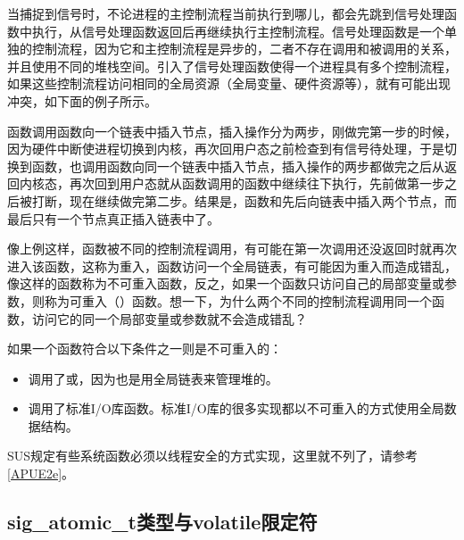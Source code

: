当捕捉到信号时，不论进程的主控制流程当前执行到哪儿，都会先跳到信号处理函数中执行，从信号处理函数返回后再继续执行主控制流程。信号处理函数是一个单独的控制流程，因为它和主控制流程是异步的，二者不存在调用和被调用的关系，并且使用不同的堆栈空间。引入了信号处理函数使得一个进程具有多个控制流程，如果这些控制流程访问相同的全局资源（全局变量、硬件资源等），就有可能出现冲突，如下面的例子所示。




函数调用函数向一个链表中插入节点，插入操作分为两步，刚做完第一步的时候，因为硬件中断使进程切换到内核，再次回用户态之前检查到有信号待处理，于是切换到函数，也调用函数向同一个链表中插入节点，插入操作的两步都做完之后从返回内核态，再次回到用户态就从函数调用的函数中继续往下执行，先前做第一步之后被打断，现在继续做完第二步。结果是，函数和先后向链表中插入两个节点，而最后只有一个节点真正插入链表中了。



像上例这样，函数被不同的控制流程调用，有可能在第一次调用还没返回时就再次进入该函数，这称为重入，函数访问一个全局链表，有可能因为重入而造成错乱，像这样的函数称为不可重入函数，反之，如果一个函数只访问自己的局部变量或参数，则称为可重入（）函数。想一下，为什么两个不同的控制流程调用同一个函数，访问它的同一个局部变量或参数就不会造成错乱？



如果一个函数符合以下条件之一则是不可重入的：


\begin{itemize}

\item 调用了或，因为也是用全局链表来管理堆的。

\item 调用了标准I/\BookSplit{}O库函数。标准I/\BookSplit{}O库的很多实现都以不可重入的方式使用全局数据结构。
\end{itemize}


SUS规定有些系统函数必须以线程安全的方式实现，这里就不列了，请参考\hyperlink{db.bi01.bibli.apue}{[APUE2e]}。


\subsection{sig\_atomic\_t类型与volatile限定符}
%


